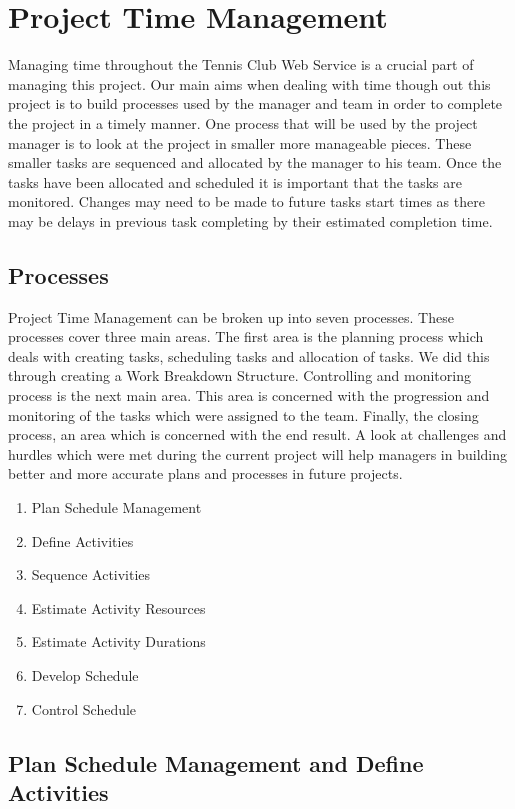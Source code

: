 \chapter{Project Time Management}

Managing time throughout the Tennis Club Web Service is a crucial part of managing this project. Our main aims when dealing with time though out this project is to build processes used by the manager and team in order to complete the project in a timely manner. One process that will be used by the project manager is to look at the project in smaller more manageable pieces. These smaller tasks are sequenced and allocated by the manager to his team. Once the tasks have been allocated and scheduled it is important that the tasks are monitored. Changes may need to be made to future tasks start times as there may be delays in previous task completing by their estimated completion time.

\section{Processes}

Project Time Management can be broken up into seven processes. These processes cover three main areas. The first area is the planning process which deals with creating tasks, scheduling tasks and allocation of tasks.  We did this through creating a Work Breakdown Structure. Controlling and monitoring process is the next main area. This area is concerned with the progression and monitoring of the tasks which were assigned to the team. Finally, the closing process, an area which is concerned with the end result. A look at challenges and hurdles which were met during the current project will help managers in building better and more accurate plans and processes in future projects.

\begin{enumerate}
\item Plan Schedule Management
\item Define Activities
\item Sequence Activities
\item Estimate Activity Resources
\item Estimate Activity Durations
\item Develop Schedule
\item Control Schedule
\end{enumerate}

\section{Plan Schedule Management and Define Activities}

